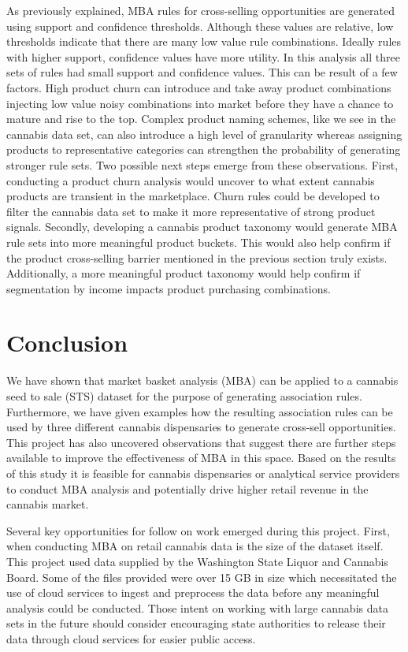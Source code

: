 \documentclass[../article.tex, 12pt]{subfiles}
\begin{document}
\begin{multicols*}{2}
As previously explained, MBA rules for cross-selling opportunities are generated using support and confidence thresholds. Although these values are relative, low thresholds indicate that there are many low value rule combinations. Ideally rules with higher support, confidence values have more utility. In this analysis all three sets of rules had small support and confidence values. This can be result of a few factors. High product churn can introduce and take away product combinations injecting low value noisy combinations into market before they have a chance to mature and rise to the top. Complex product naming schemes, like we see in the cannabis data set, can also introduce a high level of granularity whereas assigning products to representative categories can strengthen the probability of generating stronger rule sets. Two possible next steps emerge from these observations. First, conducting a product churn analysis would uncover to what extent cannabis products are transient in the marketplace. Churn rules could be developed to filter the cannabis data set to make it more representative of strong product signals. Secondly, developing a cannabis product taxonomy would generate MBA rule sets into more meaningful product buckets. This would also help confirm if the product cross-selling barrier mentioned in the previous section truly exists. Additionally, a more meaningful product taxonomy would help confirm if segmentation by income impacts product purchasing combinations.

\section{Conclusion}
\label{sec:conclusion}

We have shown that market basket analysis (MBA) can be applied to a cannabis seed to sale (STS) dataset for the purpose of generating association rules. Furthermore, we have given examples how the resulting association rules can be used by three different cannabis dispensaries to generate cross-sell opportunities. This project has also uncovered observations that suggest there are further steps available to improve the effectiveness of MBA in this space. Based on the results of this study it is feasible for cannabis dispensaries or analytical service providers to conduct MBA analysis and potentially drive higher retail revenue in the cannabis market.

\par
Several key opportunities for follow on work emerged during this project. First, when conducting MBA on retail cannabis data is the size of the dataset itself. This project used data supplied by the Washington State Liquor and Cannabis Board. Some of the files provided were over 15 GB in size which necessitated the use of cloud services to ingest and preprocess the data before any meaningful analysis could be conducted. Those intent on working with large cannabis data sets in the future should consider encouraging state authorities to release their data through cloud services for easier public access.


\end{multicols*}
\end{document}
